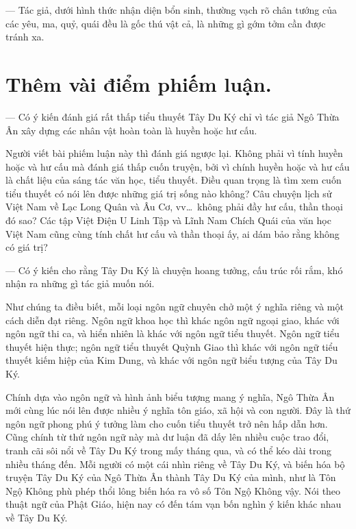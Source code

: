 — Tác giả, dưới hình thức nhận diện bổn sinh, thường vạch rõ chân tướng của các yêu, ma, quỷ, quái đều là gốc thú vật cả, là những gì gớm tởm cần được tránh xa.

\section{Thêm vài điểm phiếm luận.} %
\label{sec:them_vai_diem_phiem_luan}

— Có ý kiến đánh giá rất thấp tiểu thuyết Tây Du Ký chỉ vì tác giả Ngô Thừa Ân xây dựng các nhân vật hoàn toàn là huyền hoặc hư cấu.

Người viết bài phiếm luận này thì đánh giá ngược lại. Không phải vì tính huyền hoặc và hư cấu mà đánh giá thấp cuốn truyện, bởi vì chính huyền hoặc và hư cấu là chất liệu của sáng tác văn học, tiểu thuyết. Điều quan trọng là tìm xem cuốn tiểu thuyết có nói lên được những giá trị sống nào không? Câu chuyện lịch sử Việt Nam về Lạc Long Quân và Âu Cơ, vv\ldots ~không phải đầy hư cấu, thần thoại đó sao? Các tập Việt Điện U Linh Tập và Lĩnh Nam Chích Quái của văn học Việt Nam cũng cùng tính chất hư cấu và thần thoại ấy, ai dám bảo rằng không có giá trị?

— Có ý kiến cho rằng Tây Du Ký là chuyện hoang tưởng, cấu trúc rối rắm, khó nhận ra những gì tác giả muốn nói.

Như chúng ta điều biết, mỗi loại ngôn ngữ chuyên chở một ý nghĩa riêng và một cách diễn đạt riêng. Ngôn ngữ khoa học thì khác ngôn ngữ ngoại giao, khác với ngôn ngữ thi ca, và hiển nhiên là khác với ngôn ngữ tiểu thuyết. Ngôn ngữ tiểu thuyết hiện thực; ngôn ngữ tiểu thuyết Quỳnh Giao thì khác với ngôn ngữ tiểu thuyết kiếm hiệp của Kim Dung, và khác với ngôn ngữ biểu tượng của Tây Du Ký.

Chính dựa vào ngôn ngữ và hình ảnh biểu tượng mang ý nghĩa, Ngô Thừa Ân mới cùng lúc nói lên được nhiều ý nghĩa tôn giáo, xã hội và con người. Đây là thứ ngôn ngữ phong phú ý tưởng làm cho cuốn tiểu thuyết trở nên hấp dẫn hơn. Cũng chính từ thứ ngôn ngữ này mà dư luận đã dấy lên nhiều cuộc trao đổi, tranh cãi sôi nổi về Tây Du Ký trong mấy tháng qua, và có thể kéo dài trong nhiều tháng đến. Mỗi người có một cái nhìn riêng về Tây Du Ký, và biến hóa bộ truyện Tây Du Ký của Ngô Thừa Ân thành Tây Du Ký của mình, như là Tôn Ngộ Không phù phép thổi lông biến hóa ra vô số Tôn Ngộ Không vậy. Nói theo thuật ngữ của Phật Giáo, hiện nay có đến tám vạn bốn nghìn ý kiến khác nhau về Tây Du Ký.
